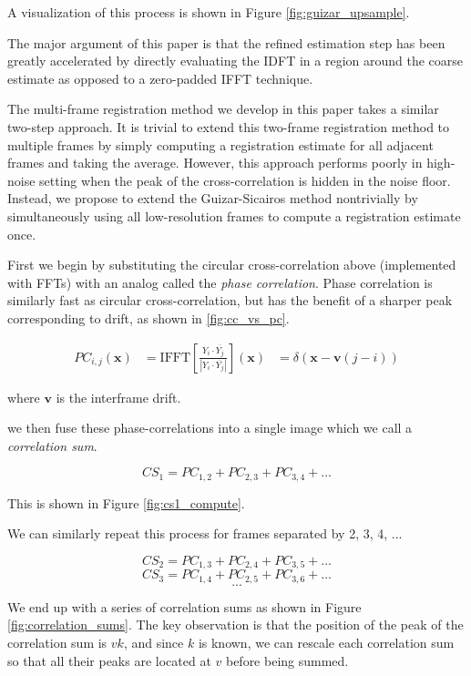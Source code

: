 \documentclass[10pt,twocolumn,letterpaper]{article}
\begin{document}
A visualization of this process is shown in Figure \ref{fig:guizar_upsample}.

The major argument of this paper is that the refined estimation step has been greatly accelerated by directly evaluating the IDFT in a region around the coarse estimate as opposed to a zero-padded IFFT technique.

The multi-frame registration method we develop in this paper takes a similar two-step approach.  It is trivial to extend this two-frame registration method to multiple frames by simply computing a registration estimate for all adjacent frames and taking the average.  However, this approach performs poorly in high-noise setting when the peak of the cross-correlation is hidden in the noise floor.  Instead, we propose to extend the Guizar-Sicairos method nontrivially by simultaneously using all low-resolution frames to compute a registration estimate once.

First we begin by substituting the circular cross-correlation above (implemented with FFTs) with an analog called the \emph{phase correlation}.  Phase correlation is similarly fast as circular cross-correlation, but has the benefit of a sharper peak corresponding to drift, as shown in \ref{fig:cc_vs_pc}.

$$
\begin{aligned}
PC_{i,j}(\bm{x}) &= \text{IFFT} \left[\frac{Y_i \cdot \overline{Y_j}}{|Y_i \cdot \overline{Y_j}|} \right](\bm{x})
&= \delta(\bm{x} - \bm{v}(j - i))
\end{aligned}
$$

where $\bm{v}$ is the interframe drift.

we then fuse these phase-correlations into a single image which we call a \emph{correlation sum}.  

$$CS_1 = PC_{1,2} + PC_{2, 3} + PC_{3, 4} + ...$$

This is shown in Figure \ref{fig:cs1_compute}.

We can similarly repeat this process for frames separated by 2, 3, 4, ...

$$CS_2 = PC_{1,3} + PC_{2, 4} + PC_{3, 5} + ...$$
$$CS_3 = PC_{1,4} + PC_{2, 5} + PC_{3, 6} + ...$$
$$...$$

We end up with a series of correlation sums as shown in Figure \ref{fig:correlation_sums}.  The key observation is that the position of the peak of the correlation sum is $vk$, and since $k$ is known, we can rescale each correlation sum so that all their peaks are located at $v$ before being summed.
\end{document}
